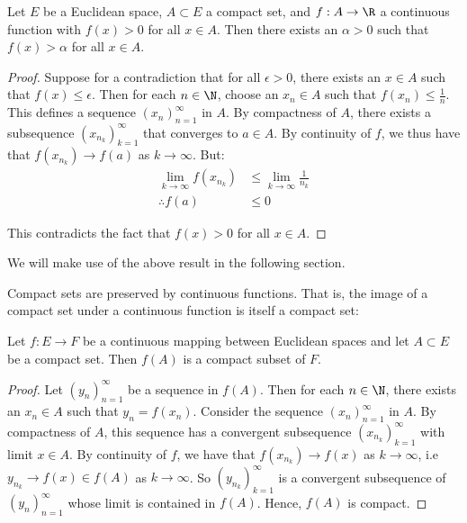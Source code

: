  \begin{proposition}
   Let \( E \) be a Euclidean space, \( A\subset E \) a compact set, and \( f:A\to\R \) a continuous function with \( f(x)>0 \) for all \( x\in A \). Then there exists an \( \alpha>0 \) such that \( f(x)>\alpha \) for all \( x\in A \).
 \end{proposition}
 \begin{proof}
   Suppose for a contradiction that for all \( \epsilon>0 \), there exists an \( x\in A \) such that \( f(x)\leq\epsilon \). Then for each \( n\in\N \), choose an \( x_n\in A \) such that \( f(x_n)\leq \frac{1}{n} \). This defines a sequence \( (x_n)_{n=1}^\infty \) in \( A \). By compactness of \( A \), there exists a subsequence \( (x_{n_k})_{k=1}^\infty \) that converges to \( a\in A \). By continuity of \( f \), we thus have that \( f(x_{n_k})\to f(a) \) as \( k\to\infty \). But:
   \begin{align*}
     \lim_{k\to\infty}f(x_{n_k})&\leq \lim_{k\to\infty}\frac{1}{n_k}\\
     \therefore f(a)&\leq 0
   \end{align*}

   This contradicts the fact that \( f(x)>0 \) for all \( x\in A \).
 \end{proof}

 We will make use of the above result in the following section.

 \vspace{3mm}

 Compact sets are preserved by continuous functions. That is, the image of a compact set under a continuous function is itself a compact set:

 \begin{proposition}
   \label{thm:cptimage}
   Let \( f:E\to F \) be a continuous mapping between Euclidean spaces and let \( A\subset E \) be a compact set. Then \( f(A) \) is a compact subset of \( F \).
 \end{proposition}
 \begin{proof}
   Let \( (y_n)_{n=1}^\infty \) be a sequence in \( f(A) \). Then for each \( n\in\N \), there exists an \( x_n\in A \) such that \( y_n=f(x_n) \). Consider the sequence \( (x_n)_{n=1}^\infty \) in \( A \). By compactness of \( A \), this sequence has a convergent subsequence \( (x_{n_k})_{k=1}^\infty \) with limit \( x\in A \). By continuity of \( f \), we have that \( f(x_{n_k})\to f(x) \) as \( k\to\infty \), i.e \( y_{n_k}\to f(x)\in f(A) \) as \( k\to\infty \). So \( (y_{n_k})_{k=1}^\infty \) is a convergent subsequence of \( (y_n)_{n=1}^\infty \) whose limit is contained in \( f(A) \). Hence, \( f(A) \) is compact.
 \end{proof}

